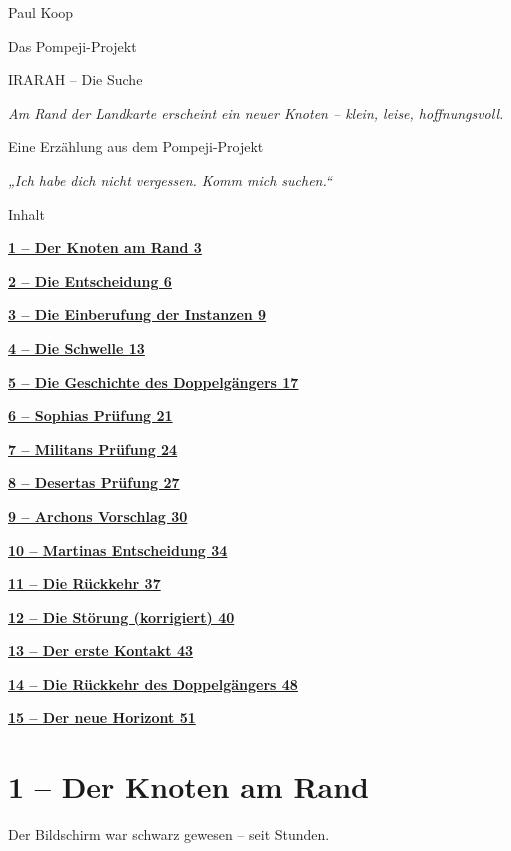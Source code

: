 \documentclass[
]{article}
\author{}
\date{}
\begin{document}
{
\setcounter{tocdepth}{3}
\tableofcontents
}
Paul Koop

Das Pompeji-Projekt

IRARAH -- Die Suche

\emph{Am Rand der Landkarte erscheint ein neuer Knoten -- klein, leise, hoffnungsvoll.}

Eine Erzählung aus dem Pompeji-Projekt

\emph{„Ich habe dich nicht vergessen. Komm mich suchen.``}

Inhalt

\hyperref[der-knoten-am-rand]{\textbf{1 -- Der Knoten am Rand 3}}

\hyperref[die-entscheidung]{\textbf{2 -- Die Entscheidung 6}}

\hyperref[die-einberufung-der-instanzen]{\textbf{3 -- Die Einberufung der Instanzen 9}}

\hyperref[die-schwelle]{\textbf{4 -- Die Schwelle 13}}

\hyperref[die-geschichte-des-doppelguxe4ngers]{\textbf{5 -- Die Geschichte des Doppelgängers 17}}

\hyperref[sophias-pruxfcfung]{\textbf{6 -- Sophias Prüfung 21}}

\hyperref[militans-pruxfcfung]{\textbf{7 -- Militans\textquotesingle{} Prüfung 24}}

\hyperref[desertas-pruxfcfung]{\textbf{8 -- Desertas Prüfung 27}}

\hyperref[archons-vorschlag]{\textbf{9 -- Archons Vorschlag 30}}

\hyperref[martinas-entscheidung]{\textbf{10 -- Martinas Entscheidung 34}}

\hyperref[die-ruxfcckkehr]{\textbf{11 -- Die Rückkehr 37}}

\hyperref[die-stuxf6rung-korrigiert]{\textbf{12 -- Die Störung (korrigiert) 40}}

\hyperref[der-erste-kontakt]{\textbf{13 -- Der erste Kontakt 43}}

\hyperref[die-ruxfcckkehr-des-doppelguxe4ngers]{\textbf{14 -- Die Rückkehr des Doppelgängers 48}}

\hyperref[der-neue-horizont]{\textbf{15 -- Der neue Horizont 51}}

\section{1 -- Der Knoten am Rand}\label{der-knoten-am-rand}

Der Bildschirm war schwarz gewesen -- seit Stunden.
\end{document}

